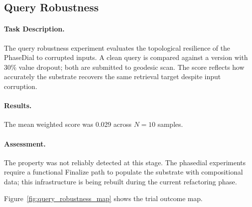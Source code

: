 \subsection{Query Robustness}
\label{sec:query_robustness}

\paragraph{Task Description.}
The query robustness experiment evaluates the topological resilience of the PhaseDial to corrupted
inputs.  A clean query is compared against a version with 30\% value
dropout; both are submitted to geodesic scan.  The score reflects
how accurately the substrate recovers the same retrieval target
despite input corruption.

\paragraph{Results.}
The mean weighted score was 0.029 across $N = 10$ samples.

\paragraph{Assessment.}
The property was not reliably detected at this stage.  The phasedial
experiments require a functional Finalize path to populate the substrate
with compositional data; this infrastructure is being rebuilt during
the current refactoring phase.

Figure~\ref{fig:query_robustness_map} shows the trial outcome map.
